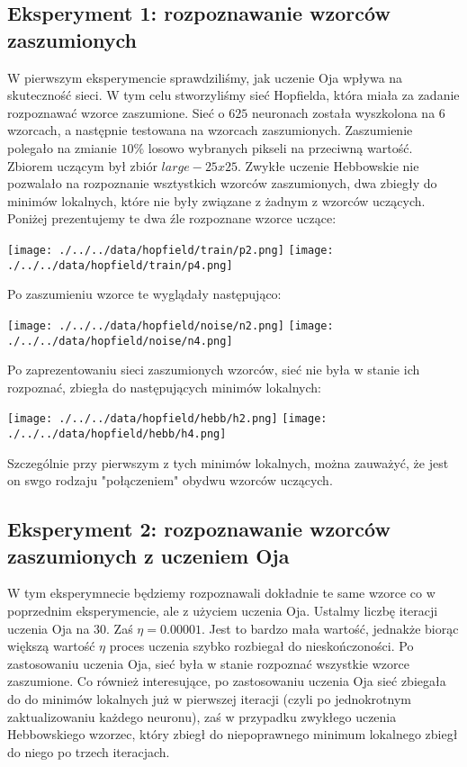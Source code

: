 \documentclass{article}
\begin{document}
\subsection{Eksperyment 1: rozpoznawanie wzorców zaszumionych}
W pierwszym eksperymencie sprawdziliśmy, jak uczenie Oja wpływa na skuteczność sieci.
W tym celu stworzyliśmy sieć Hopfielda, która miała za zadanie rozpoznawać wzorce zaszumione.
Sieć o $625$ neuronach została wyszkolona na $6$ wzorcach, a następnie testowana na wzorcach zaszumionych.
Zaszumienie polegało na zmianie $10\%$ losowo wybranych pikseli na przeciwną wartość.
Zbiorem uczącym był zbiór $large-25x25$. Zwykłe uczenie Hebbowskie nie pozwalało na rozpoznanie wsztystkich wzorców zaszumionych,
dwa zbiegły do minimów lokalnych, które nie były związane z żadnym z wzorców uczących.
Poniżej prezentujemy te dwa źle rozpoznane wzorce uczące:
\begin{center}
    \texttt{[image: ./../../data/hopfield/train/p2.png]}
    \texttt{[image: ./../../data/hopfield/train/p4.png]}
\end{center}
Po zaszumieniu wzorce te wyglądały następująco:
\begin{center}
    \texttt{[image: ./../../data/hopfield/noise/n2.png]}
    \texttt{[image: ./../../data/hopfield/noise/n4.png]}
\end{center}
Po zaprezentowaniu sieci zaszumionych wzorców, sieć nie była w stanie ich rozpoznać, zbiegła
do następujących minimów lokalnych:
\begin{center}
    \texttt{[image: ./../../data/hopfield/hebb/h2.png]}
    \texttt{[image: ./../../data/hopfield/hebb/h4.png]}
\end{center}
Szczególnie przy pierwszym z tych minimów lokalnych, można zauważyć, że jest on swgo rodzaju "połączeniem" 
obydwu wzorców uczących.
\subsection{Eksperyment 2: rozpoznawanie wzorców zaszumionych z uczeniem Oja}
W tym eksperymnecie będziemy rozpoznawali dokładnie te same wzorce co w poprzednim eksperymencie, 
ale z użyciem uczenia Oja. Ustalmy liczbę iteracji uczenia Oja na $30$. Zaś $\eta = 0.00001$.
Jest to bardzo mała wartość, jednakże biorąc większą wartość $\eta$ proces uczenia szybko rozbiegał do nieskończoności.
Po zastosowaniu uczenia Oja, sieć była w stanie rozpoznać wszystkie wzorce zaszumione.
Co również interesujące, po zastosowaniu uczenia Oja sieć zbiegała do do minimów lokalnych już w pierwszej iteracji
(czyli po jednokrotnym zaktualizowaniu każdego neuronu), zaś w przypadku zwykłego uczenia Hebbowskiego wzorzec, który
zbiegł do niepoprawnego minimum lokalnego zbiegł do niego po trzech iteracjach.
\end{document}
